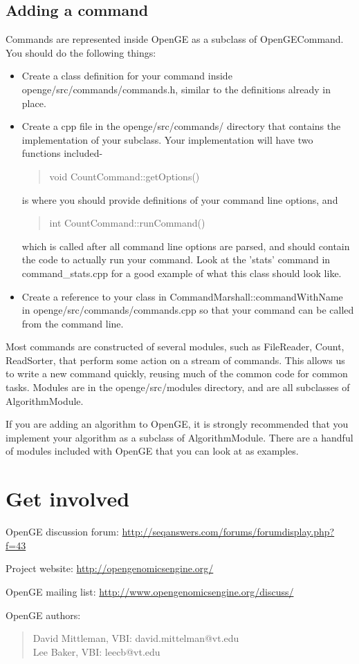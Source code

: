 \documentclass[11pt]{article}
\newcommand {\cmd}[1] {\begin{quote}#1\end{quote}}
\begin{document}
\subsection {Adding a command}
Commands are represented inside OpenGE as a subclass of OpenGECommand. You should do the following things:
\begin{itemize}
\item Create a class definition for your command inside openge/src/commands/commands.h, similar to the definitions already in place.
\item Create a cpp file in the openge/src/commands/ directory that contains the implementation of your subclass. Your implementation will have two functions included- 
\cmd {void CountCommand::getOptions()}
is where you should provide definitions of your command line options, and 
\cmd{int CountCommand::runCommand()}
which is called after all command line options are parsed, and should contain the code to actually run your command. Look at the 'stats' command in command\_stats.cpp for a good example of what this class should look like.
\item Create a reference to your class in CommandMarshall::commandWithName in openge/src/commands/commands.cpp so that your command can be called from the command line.
\end{itemize}

Most commands are constructed of several modules, such as FileReader, Count, ReadSorter, that perform some action on a stream of commands. This allows us to write a new command quickly, reusing much of the common code for common tasks. Modules are in the openge/src/modules directory, and are all subclasses of AlgorithmModule.

If you are adding an algorithm to OpenGE, it is strongly recommended that you implement your algorithm as a subclass of AlgorithmModule. There are a handful of modules included with OpenGE that you can look at as examples.

\section {Get involved}

OpenGE discussion forum: \url{http://seqanswers.com/forums/forumdisplay.php?f=43}

Project website: \url{http://opengenomicsengine.org/}

OpenGE mailing list: \url{http://www.opengenomicsengine.org/discuss/}

OpenGE authors:
\cmd{David Mittleman, VBI: david.mittelman@vt.edu\\Lee Baker, VBI: leecb@vt.edu}
\end{document}
